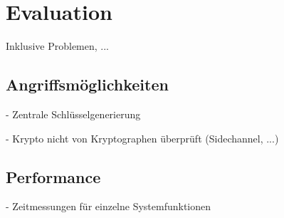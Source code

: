 \section{Evaluation}

\label{sec_impl_evaluation}

Inklusive Problemen, ...

\subsection{Angriffsmöglichkeiten}

- Zentrale Schlüsselgenerierung

- Krypto nicht von Kryptographen überprüft (Sidechannel, ...)

\subsection{Performance}

- Zeitmessungen für einzelne Systemfunktionen
